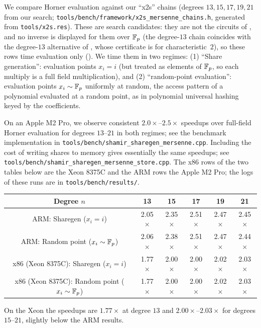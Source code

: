 We compare Horner evaluation against our ``x2s'' chains (degrees $13,15,17,19,21$ from our search;
\texttt{tools/bench/framework/x2s\_mersenne\_chains.h}, generated from \texttt{tools/x2s.res}).
These are search candidates: they are not the circuits of , and no
inverse is displayed for them over $\mathbb{F}_p$ (the degree-$13$ chain coincides with the degree-$13$
alternative of , whose certificate is for characteristic~$2$), so
these rows time evaluation only ().  We time them
in two regimes:
(1) ``Share generation'': evaluation points $x_i = i$ (but treated as elements of $\mathbb{F}_p$, so each
multiply is a full field multiplication), and
(2) ``random-point evaluation'': evaluation points $x_i \sim \mathbb{F}_p$ uniformly at random,
the access pattern of a polynomial evaluated at a random point, as in polynomial
universal hashing keyed by the coefficients.

On an Apple M2 Pro, we observe consistent $2.0\times$--$2.5\times$ speedups over full-field Horner
evaluation for degrees $13$--$21$ in both regimes; see the benchmark implementation in
\texttt{tools/bench/\allowbreak shamir\_\allowbreak sharegen\_\allowbreak mersenne.cpp}.
Including the cost of writing shares to memory gives essentially the same speedups; see
\texttt{tools/bench/\allowbreak shamir\_\allowbreak sharegen\_\allowbreak mersenne\_\allowbreak store.cpp}.
The x86 rows of the two tables below are the Xeon 8375C and the ARM rows
the Apple M2 Pro; the logs of these runs are in
\texttt{tools/bench/\allowbreak results/}.

\begin{center}
\begin{tabular}{c|ccccc}
Degree $n$ & 13 & 15 & 17 & 19 & 21 \\
\hline
ARM: Sharegen ($x_i=i$) & 2.05$\times$ & 2.35$\times$ & 2.51$\times$ & 2.47$\times$ & 2.45$\times$ \\
ARM: Random point ($x_i \sim \mathbb{F}_p$) & 2.06$\times$ & 2.38$\times$ & 2.51$\times$ & 2.47$\times$ & 2.44$\times$ \\
\hline
x86 (Xeon 8375C): Sharegen ($x_i=i$) & 1.77$\times$ & 2.00$\times$ & 2.00$\times$ & 2.02$\times$ & 2.03$\times$ \\
x86 (Xeon 8375C): Random point ($x_i \sim \mathbb{F}_p$) & 1.77$\times$ & 2.00$\times$ & 2.00$\times$ & 2.02$\times$ & 2.03$\times$
\end{tabular}
\end{center}
On the Xeon the speedups are $1.77\times$ at degree $13$ and $2.00\times$--$2.03\times$ for
degrees $15$--$21$, slightly below the ARM results.

